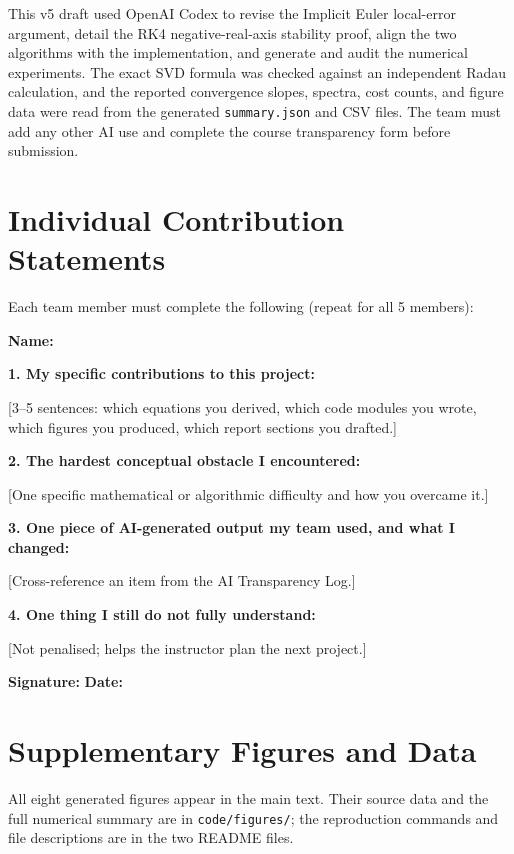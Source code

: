 \documentclass[11pt,a4paper]{article}
\theoremstyle{definition}
\theoremstyle{remark}
\begin{document}
This v5 draft used OpenAI Codex to revise the Implicit Euler local-error
argument, detail the RK4 negative-real-axis stability proof, align the
two algorithms with the implementation, and generate and audit the
numerical experiments. The exact SVD formula was checked against an
independent Radau calculation, and the reported convergence slopes,
spectra, cost counts, and figure data were read from the generated
\texttt{summary.json} and CSV files. The team must add any other AI use
and complete the course transparency form before submission.

\section{Individual Contribution Statements}

Each team member must complete the following (repeat for all 5 members):

\begin{formbox}
\textbf{Name:} \underline{\hspace{5cm}}

\vspace{0.5em}
\textbf{1. My specific contributions to this project:}

[3--5 sentences: which equations you derived, which code modules you wrote,
which figures you produced, which report sections you drafted.]

\vspace{0.5em}
\textbf{2. The hardest conceptual obstacle I encountered:}

[One specific mathematical or algorithmic difficulty and how you overcame it.]

\vspace{0.5em}
\textbf{3. One piece of AI-generated output my team used, and what I changed:}

[Cross-reference an item from the AI Transparency Log.]

\vspace{0.5em}
\textbf{4. One thing I still do not fully understand:}

[Not penalised; helps the instructor plan the next project.]

\vspace{0.5em}
\textbf{Signature:} \underline{\hspace{4cm}} \quad \textbf{Date:} \underline{\hspace{2cm}}
\end{formbox}

\section{Supplementary Figures and Data}

All eight generated figures appear in the main text. Their source data
and the full numerical summary are in \texttt{code/figures/}; the
reproduction commands and file descriptions are in the two README files.
\end{document}
